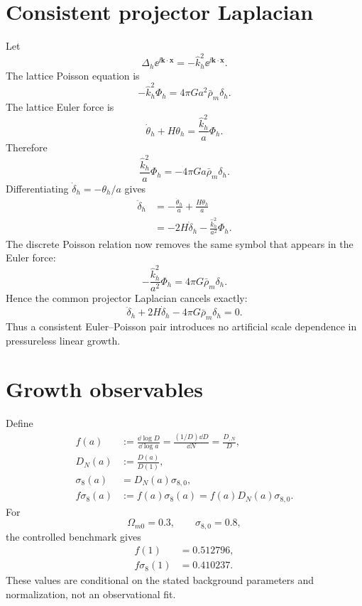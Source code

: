 \section{Consistent projector Laplacian}
Let
\begin{equation}
\Delta_h\ee^{\ii\bm k\cdot\bm x}
=-\widehat k_h^2\ee^{\ii\bm k\cdot\bm x}.
\end{equation}
The lattice Poisson equation is
\begin{equation}
-\widehat k_h^2\Phi_h
=4\pi Ga^2\bar\rho_m\delta_h.
\end{equation}
The lattice Euler force is
\begin{equation}
\dot\theta_h+H\theta_h
=\frac{\widehat k_h^2}{a}\Phi_h.
\end{equation}
Therefore
\begin{equation}
\boxed{
\frac{\widehat k_h^2}{a}\Phi_h
=-4\pi Ga\bar\rho_m\delta_h.
}
\end{equation}
Differentiating \(\dot\delta_h=-\theta_h/a\) gives
\begin{align}
\ddot\delta_h
&=-\frac{\dot\theta_h}{a}
+\frac{H\theta_h}{a}\\
&=-2H\dot\delta_h
-\frac{\widehat k_h^2}{a^2}\Phi_h.
\end{align}
The discrete Poisson relation now removes the same symbol that appears in the Euler force:
\begin{equation}
-\frac{\widehat k_h^2}{a^2}\Phi_h
=4\pi G\bar\rho_m\delta_h.
\end{equation}
Hence the common projector Laplacian cancels exactly:
\begin{equation}
\boxed{
\ddot\delta_h+2H\dot\delta_h
-4\pi G\bar\rho_m\delta_h=0.
}
\end{equation}
Thus a consistent Euler--Poisson pair introduces no artificial scale dependence in pressureless linear growth.

\section{Growth observables}
Define
\begin{align}
f(a)
&:=\frac{\dd\log D}{\dd\log a}
=\frac{(1/D)\dd D}{\dd N}
=\frac{D_{,N}}{D},\\
D_N(a)&:=\frac{D(a)}{D(1)},\\
\sigma_8(a)&=D_N(a)\sigma_{8,0},\\
f\sigma_8(a)&:=f(a)\sigma_8(a)
=f(a)D_N(a)\sigma_{8,0}.
\end{align}
For
\begin{equation}
\Omega_{m0}=0.3,
\qquad
\sigma_{8,0}=0.8,
\end{equation}
the controlled benchmark gives
\begin{align}
f(1)&=0.512796,\\
f\sigma_8(1)&=0.410237.
\end{align}
These values are conditional on the stated background parameters and normalization, not an observational fit.

